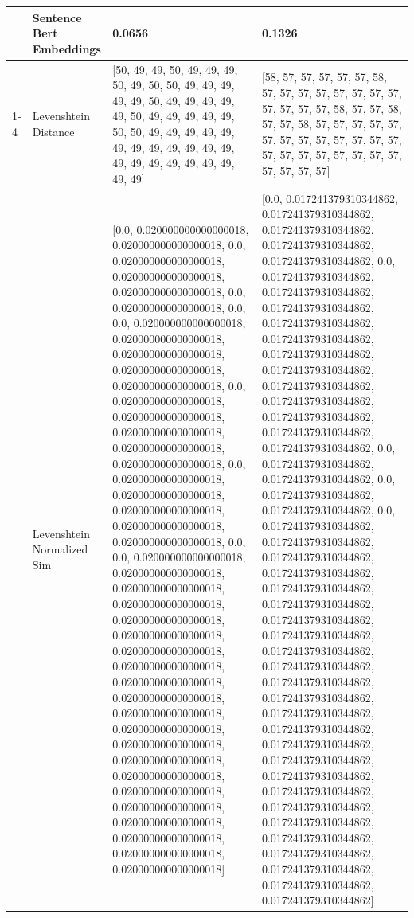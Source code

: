\begin{tabular}{llll}
 & Sentence Bert Embeddings & 0.0656 & 0.1326 \\
\cline{1-4}
\multirow[t]{4}{*}{Gutiri mwana ungitema agitemera ithe} & Levenshtein Distance & [50, 49, 49, 50, 49, 49, 49, 50, 49, 50, 50, 49, 49, 49, 49, 49, 50, 49, 49, 49, 49, 49, 50, 49, 49, 49, 49, 49, 50, 50, 49, 49, 49, 49, 49, 49, 49, 49, 49, 49, 49, 49, 49, 49, 49, 49, 49, 49, 49, 49, 49] & [58, 57, 57, 57, 57, 57, 58, 57, 57, 57, 57, 57, 57, 57, 57, 57, 57, 57, 57, 58, 57, 57, 58, 57, 57, 58, 57, 57, 57, 57, 57, 57, 57, 57, 57, 57, 57, 57, 57, 57, 57, 57, 57, 57, 57, 57, 57, 57, 57, 57, 57] \\
 & Levenshtein Normalized Sim & [0.0, 0.020000000000000018, 0.020000000000000018, 0.0, 0.020000000000000018, 0.020000000000000018, 0.020000000000000018, 0.0, 0.020000000000000018, 0.0, 0.0, 0.020000000000000018, 0.020000000000000018, 0.020000000000000018, 0.020000000000000018, 0.020000000000000018, 0.0, 0.020000000000000018, 0.020000000000000018, 0.020000000000000018, 0.020000000000000018, 0.020000000000000018, 0.0, 0.020000000000000018, 0.020000000000000018, 0.020000000000000018, 0.020000000000000018, 0.020000000000000018, 0.0, 0.0, 0.020000000000000018, 0.020000000000000018, 0.020000000000000018, 0.020000000000000018, 0.020000000000000018, 0.020000000000000018, 0.020000000000000018, 0.020000000000000018, 0.020000000000000018, 0.020000000000000018, 0.020000000000000018, 0.020000000000000018, 0.020000000000000018, 0.020000000000000018, 0.020000000000000018, 0.020000000000000018, 0.020000000000000018, 0.020000000000000018, 0.020000000000000018, 0.020000000000000018, 0.020000000000000018] & [0.0, 0.017241379310344862, 0.017241379310344862, 0.017241379310344862, 0.017241379310344862, 0.017241379310344862, 0.0, 0.017241379310344862, 0.017241379310344862, 0.017241379310344862, 0.017241379310344862, 0.017241379310344862, 0.017241379310344862, 0.017241379310344862, 0.017241379310344862, 0.017241379310344862, 0.017241379310344862, 0.017241379310344862, 0.017241379310344862, 0.0, 0.017241379310344862, 0.017241379310344862, 0.0, 0.017241379310344862, 0.017241379310344862, 0.0, 0.017241379310344862, 0.017241379310344862, 0.017241379310344862, 0.017241379310344862, 0.017241379310344862, 0.017241379310344862, 0.017241379310344862, 0.017241379310344862, 0.017241379310344862, 0.017241379310344862, 0.017241379310344862, 0.017241379310344862, 0.017241379310344862, 0.017241379310344862, 0.017241379310344862, 0.017241379310344862, 0.017241379310344862, 0.017241379310344862, 0.017241379310344862, 0.017241379310344862, 0.017241379310344862, 0.017241379310344862, 0.017241379310344862, 0.017241379310344862, 0.017241379310344862] \\

\end{tabular}
